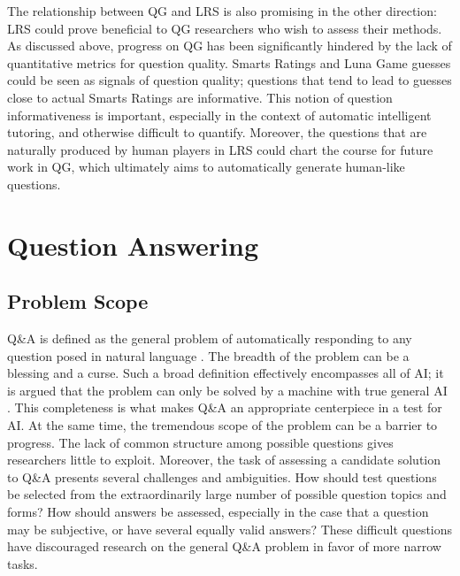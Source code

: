 The relationship between QG and LRS is also promising in the other direction: LRS could prove beneficial to QG researchers who wish to assess their methods. As discussed above, progress on QG has been significantly hindered by the lack of quantitative metrics for question quality. Smarts Ratings and Luna Game guesses could be seen as signals of question quality; questions that tend to lead to guesses close to actual Smarts Ratings are informative.  This notion of question informativeness is important, especially in the context of automatic intelligent tutoring, and otherwise difficult to quantify. Moreover, the questions that are naturally produced by human players in LRS could chart the course for future work in QG, which ultimately aims to automatically generate human-like questions.

\section{Question Answering}

\subsection{Problem Scope}

Q\&A is defined as the general problem of automatically responding to any question posed in natural language \citep{andrenucci2005automated, hirschman2001natural}. The breadth of the problem can be a blessing and a curse. Such a broad definition effectively encompasses all of AI; it is argued that the problem can only be solved by a machine with true general AI \citep{yampolskiy2013turing}. This completeness is what makes Q\&A an appropriate centerpiece in a test for AI. At the same time, the tremendous scope of the problem can be a barrier to progress. The lack of common structure among possible questions gives researchers little to exploit. Moreover, the task of assessing a candidate solution to Q\&A presents several challenges and ambiguities. How should test questions be selected from the extraordinarily large number of possible question topics and forms? How should answers be assessed, especially in the case that a question may be subjective, or have several equally valid answers? These difficult questions have discouraged research on the general Q\&A problem in favor of more narrow tasks.


